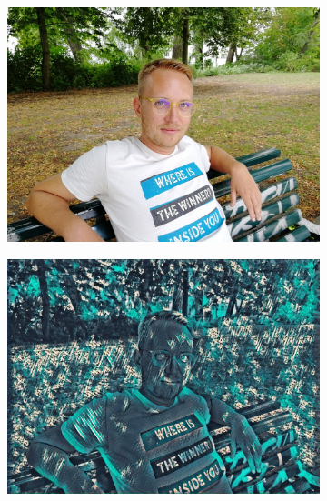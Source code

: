 \begin{figure}[H]
    \begin{subfigure}[h]{0.32\textwidth}
        \centering
        \includegraphics[width=\textwidth]{resources/content/content/ich.jpg}
    \end{subfigure}
    \begin{subfigure}[h]{0.32\textwidth}
        \centering
        \includegraphics[width=\textwidth]{resources/content/experiments/ich-vgg16_teal_and_black_abstract_painting.jpg}
    \end{subfigure}
    \begin{subfigure}[h]{0.32\textwidth}
        \centering

\end{subfigure}
\end{figure}
